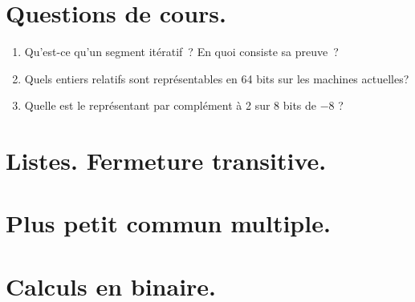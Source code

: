 

\section{Questions de cours.}
\begin{enumerate}
  \item Qu'est-ce qu'un \og segment itératif\fg~? En quoi consiste sa \og preuve\fg~? 
  \item Quels entiers relatifs sont représentables en 64 bits sur les machines actuelles?
  \item Quelle est le représentant par complément à 2 sur 8 bits de $-8$ ? 
\end{enumerate}
\section{Listes. Fermeture transitive.}

\section{Plus petit commun multiple.}

\section{Calculs en binaire.}

